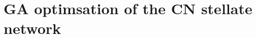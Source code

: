 \documentclass[11pt,a4paper,twoside,openright]{book}
\begin{document}

		{%
			\singlespacing%
                        \listoftodos
			\tableofcontents%
                        \printglossary
		   \clearpage%
		}%


\setcounter{chapter}{4}
\chapter[GAChapter]{GA optimsation of the CN stellate network}
\label{sec:GAChapter}


\newpage

{\small{}}
\newpage

\newpage

\newpage

\newpage






 
\end{document}
